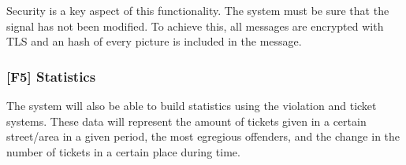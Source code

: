 Security is a key aspect of this functionality. The system must be sure that the signal has not been modified.
To achieve this, all messages are encrypted with TLS and an hash of every picture is included in the message.

\subsubsection[Statistics]{[F5] Statistics\hypertarget{sec:f5}{}}
The system will also be able to build statistics using the violation and ticket systems.
These data will represent the amount of tickets given in a certain street/area in a given period, the most egregious offenders, and the change in the number of tickets in a certain place during time.
\clearpage